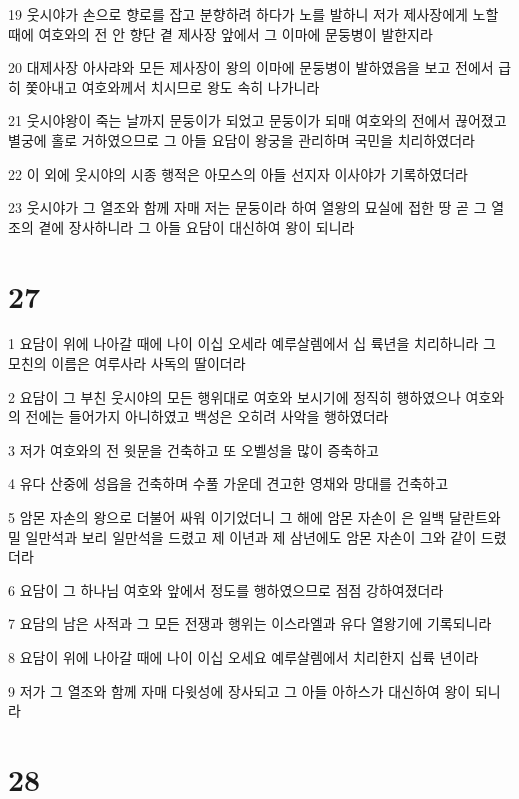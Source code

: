\par 19 웃시야가 손으로 향로를 잡고 분향하려 하다가 노를 발하니 저가 제사장에게 노할 때에 여호와의 전 안 향단 곁 제사장 앞에서 그 이마에 문둥병이 발한지라
\par 20 대제사장 아사랴와 모든 제사장이 왕의 이마에 문둥병이 발하였음을 보고 전에서 급히 쫓아내고 여호와께서 치시므로 왕도 속히 나가니라
\par 21 웃시야왕이 죽는 날까지 문둥이가 되었고 문둥이가 되매 여호와의 전에서 끊어졌고 별궁에 홀로 거하였으므로 그 아들 요담이 왕궁을 관리하며 국민을 치리하였더라
\par 22 이 외에 웃시야의 시종 행적은 아모스의 아들 선지자 이사야가 기록하였더라
\par 23 웃시야가 그 열조와 함께 자매 저는 문둥이라 하여 열왕의 묘실에 접한 땅 곧 그 열조의 곁에 장사하니라 그 아들 요담이 대신하여 왕이 되니라

\chapter{27}

\par 1 요담이 위에 나아갈 때에 나이 이십 오세라 예루살렘에서 십 륙년을 치리하니라 그 모친의 이름은 여루사라 사독의 딸이더라
\par 2 요담이 그 부친 웃시야의 모든 행위대로 여호와 보시기에 정직히 행하였으나 여호와의 전에는 들어가지 아니하였고 백성은 오히려 사악을 행하였더라
\par 3 저가 여호와의 전 윗문을 건축하고 또 오벨성을 많이 증축하고
\par 4 유다 산중에 성읍을 건축하며 수풀 가운데 견고한 영채와 망대를 건축하고
\par 5 암몬 자손의 왕으로 더불어 싸워 이기었더니 그 해에 암몬 자손이 은 일백 달란트와 밀 일만석과 보리 일만석을 드렸고 제 이년과 제 삼년에도 암몬 자손이 그와 같이 드렸더라
\par 6 요담이 그 하나님 여호와 앞에서 정도를 행하였으므로 점점 강하여졌더라
\par 7 요담의 남은 사적과 그 모든 전쟁과 행위는 이스라엘과 유다 열왕기에 기록되니라
\par 8 요담이 위에 나아갈 때에 나이 이십 오세요 예루살렘에서 치리한지 십륙 년이라
\par 9 저가 그 열조와 함께 자매 다윗성에 장사되고 그 아들 아하스가 대신하여 왕이 되니라

\chapter{28}

